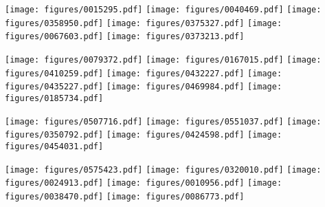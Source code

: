 \documentclass[10pt,twocolumn,letterpaper]{article}
\begin{document}
\begin{figure*}
\begin{center}
      \centering
      {\texttt{[image: figures/0015295.pdf]}}
      {\texttt{[image: figures/0040469.pdf]}}
      {\texttt{[image: figures/0358950.pdf]}} 
      {\texttt{[image: figures/0375327.pdf]}} 
      {\texttt{[image: figures/0067603.pdf]}}
      {\texttt{[image: figures/0373213.pdf]}} 

  \vspace{1mm}
  \centering
      {\texttt{[image: figures/0079372.pdf]}}      
      {\texttt{[image: figures/0167015.pdf]}}
      {\texttt{[image: figures/0410259.pdf]}}
      {\texttt{[image: figures/0432227.pdf]}}
      {\texttt{[image: figures/0435227.pdf]}}
      {\texttt{[image: figures/0469984.pdf]}}
      {\texttt{[image: figures/0185734.pdf]}}      
      
  \vspace{1mm}
  \centering
      {\texttt{[image: figures/0507716.pdf]}}
      {\texttt{[image: figures/0551037.pdf]}}      
      {\texttt{[image: figures/0350792.pdf]}}        
      {\texttt{[image: figures/0424598.pdf]}}    
      {\texttt{[image: figures/0454031.pdf]}}    
      
  \vspace{1mm}
  \centering
      {\texttt{[image: figures/0575423.pdf]}} 
      {\texttt{[image: figures/0320010.pdf]}} 
      {\texttt{[image: figures/0024913.pdf]}} 
      {\texttt{[image: figures/0010956.pdf]}} 
      {\texttt{[image: figures/0038470.pdf]}} 
      {\texttt{[image: figures/0086773.pdf]}} 


\end{center}
\end{figure*}
\end{document}
